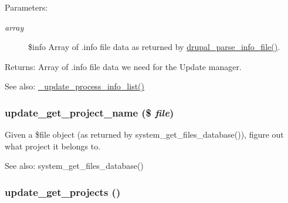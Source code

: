 \begin{Desc}
\item[Parameters:]
\begin{description}
\item[{\em array}]\$info Array of .info file data as returned by \hyperlink{common_8inc_277955232059631211fcfde533ea89d6}{drupal\_\-parse\_\-info\_\-file()}.\end{description}
\end{Desc}
\begin{Desc}
\item[Returns:]Array of .info file data we need for the Update manager.\end{Desc}
\begin{Desc}
\item[See also:]\hyperlink{update_8compare_8inc_2b2d551dec351632628042f08882244f}{\_\-update\_\-process\_\-info\_\-list()} \end{Desc}
\hypertarget{update_8compare_8inc_02c561b213ab3df2e929917736dc2b7b}{
\subsubsection[{update\_\-get\_\-project\_\-name}]{\setlength{\rightskip}{0pt plus 5cm}update\_\-get\_\-project\_\-name (\$ {\em file})}}
\label{update_8compare_8inc_02c561b213ab3df2e929917736dc2b7b}


Given a \$file object (as returned by system\_\-get\_\-files\_\-database()), figure out what project it belongs to.

\begin{Desc}
\item[See also:]system\_\-get\_\-files\_\-database() \end{Desc}
\hypertarget{update_8compare_8inc_7e1ea49d91f2d2b81b8101d481d10300}{
\subsubsection[{update\_\-get\_\-projects}]{\setlength{\rightskip}{0pt plus 5cm}update\_\-get\_\-projects ()}}
\label{update_8compare_8inc_7e1ea49d91f2d2b81b8101d481d10300}


